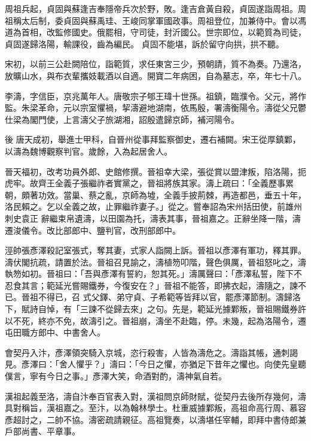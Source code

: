 \begin{pinyinscope}
 周祖兵起，貞固與蘇逢吉奉隱帝兵次於野，敗。逢吉倉黃自殺，貞固遂詣周祖。周祖稱太后制，委貞固與蘇禹珪、王峻同掌軍國政事。周祖登位，加兼侍中。會以馮道為首相，改監修國史。俄罷相，守司徒，封沂國公。世宗即位，以範質為司徒，貞固遂歸洛陽，輸課役，齒為編民。
 貞固不能堪，訴於留守向拱，拱不聽。



 宋初，以前三公赴闕陪位，詣範質，求任東宮三少，預朝請，質不為奏。乃還洛，放曠山水，與布衣輩攜妓載酒以自適。開寶二年病困，自為墓志，卒，年七十八。



 李濤，字信臣，京兆萬年人。唐敬宗子郇王瑋十世孫。祖鎮，臨濮令。父元，將作監。朱梁革命，元以宗室懼禍，挈濤避地湖南，依馬殷，署濤衡陽令。濤從父兄鬱仕梁為閣門使，上言濤父子旅湖湘，詔殷遣歸京師，補河陽令。



 後
 唐天成初，舉進士甲科，自晉州從事拜監察御史，遷右補闕。宋王從厚鎮鄴，以濤為魏博觀察判官。歲餘，入為起居舍人。



 晉天福初，改考功員外郎、史館修撰。晉祖幸大梁，張從賞以盟津叛，陷洛陽，扼虎牢。故齊王全義子張繼祚者實黨之，晉祖將族其家。濤上疏曰：「全義歷事累朝，頗著功效。當巢、蔡之亂，京師為墟，全義手披荊棘，再造都邑，垂五十年，洛民賴之。乞以全義之故，止罪繼祚妻子。」從之。嘗奉詔為宋州括田使，前雄州刺史袁正
 辭繼束帛遺濤，以田園為托，濤表其事，晉祖嘉之。正辭坐降一階，濤遷浚儀令。改比部郎中、鹽判官，改刑部郎中。



 涇帥張彥澤殺記室張式，奪其妻，式家人詣闕上訴。晉祖以彥澤有軍功，釋其罪。濤伏閣抗疏，請置於法。晉祖召見諭之，濤植笏叩階，聲色俱厲，晉祖怒叱之，濤執笏如初。晉祖曰：「吾與彥澤有誓約，恕其死。」濤厲聲曰：「彥澤私誓，陛下不忍食其言；範延光嘗賜鐵券，今復安在？」晉祖不能答，即拂衣起，濤隨之，諫不已。晉祖不得已，召
 式父鐸、弟守貞、子希範等皆拜以官，罷彥澤節制。濤歸洛下，賦詩自悼，有「三諫不從歸去來」之句。先是，範延光據鄴叛，晉祖賜鐵券許以不死，終亦不免，故濤引之。晉祖崩，濤坐不赴臨，停。未幾，起為洛陽令，遷屯田職方郎中、中書舍人。



 會契丹入汴，彥澤領突騎入京城，恣行殺害，人皆為濤危之。濤詣其帳，通刺謁見。彥澤曰：「舍人懼乎？」濤曰：「今日之懼，亦猶足下昔年之懼也。向使先皇聽僕言，寧有今日之事。」彥澤大笑，命酒對酌，濤神氣自若。



 漢祖起義至洛，濤自汴奉百官表入對，漢祖問京師財賦，從契丹去後所存幾何，濤具對稱旨，漢祖嘉之。至汴，以為翰林學士。杜重威據鄴叛，高祖命高行周、慕容彥超討之，二帥不協。濤密疏請親征。高祖覽奏，以濤堪任宰輔，即拜中書侍郎兼戶部尚書、平章事。




\end{pinyinscope}
